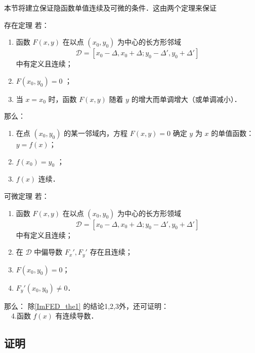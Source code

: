
本节将建立保证隐函数单值连续及可微的条件．这由两个定理来保证
\begin{theorem}{存在定理}\label{ImFED_the1}
若：\begin{enumerate}
\item 函数 $F(x,y)$ 在以点 $(x_0,y_0)$ 为中心的长方形邻域
\begin{equation}
\mathcal{D}=[x_0-\Delta,x_0+\Delta;y_0-\Delta',y_0+\Delta']
\end{equation}
中有定义且连续；
\item $F(x_0,y_0)=0$ ；
\item 当 $x=x_0$ 时，函数 $F(x,y)$ 随着 $y$ 的增大而单调增大（或单调减小）．
\end{enumerate}
那么：
\begin{enumerate}
\item 在点 $(x_0,y_0)$ 的某一邻域内，方程 $F(x,y)=0$ 确定 $y$ 为 $x$ 的单值函数： $y=f(x)$；
\item $f(x_0)=y_0$ ；
\item $f(x)$ 连续．
\end{enumerate}
\end{theorem}

\begin{theorem}{可微定理}
若：
\begin{enumerate}
\item 函数 $F(x,y)$ 在以点 $(x_0,y_0)$ 为中心的长方形领域
\begin{equation}
\mathcal{D}=[x_0-\Delta,x_0+\Delta;y_0-\Delta',y_0+\Delta']
\end{equation}
中有定义且连续；
\item 在 $\mathcal{D}$ 中偏导数 $F_x',F_y'$ 存在且连续；
\item $F(x_0,y_0)=0$；
\item $F_y'(x_0,y_0)\neq0$．
\end{enumerate}
那么：
除\autoref{ImFED_the1} 的结论1,2,3外，还可证明：\\
$\quad$4.函数 $f(x)$ 有连续导数．

\end{theorem}
\subsection{证明}
